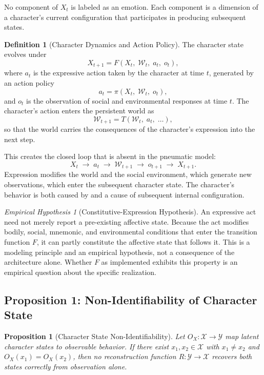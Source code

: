 \documentclass[11pt,a4paper]{article}
\theoremstyle{plain}
\newtheorem{proposition}[theorem]{Proposition}
\theoremstyle{definition}
\newtheorem{definition}[theorem]{Definition}
\theoremstyle{remark}
\newtheorem{hypothesis}[theorem]{Empirical Hypothesis}
\begin{document}
No component of $X_t$ is labeled as an emotion. Each component is a dimension of a character's current configuration that participates in producing subsequent states.

\begin{definition}[Character Dynamics and Action Policy]
The character state evolves under
\[
X_{t+1} = F(X_t,\; \mathcal{W}_t,\; a_t,\; o_t),
\]
where $a_t$ is the expressive action taken by the character at time $t$, generated by an action policy
\[
a_t = \pi(X_t,\; \mathcal{W}_t,\; o_t),
\]
and $o_t$ is the observation of social and environmental responses at time $t$. The character's action enters the persistent world as
\[
\mathcal{W}_{t+1} = T(\mathcal{W}_t,\; a_t,\; \ldots),
\]
so that the world carries the consequences of the character's expression into the next step.
\end{definition}

This creates the closed loop that is absent in the pneumatic model:
\[
X_t \;\to\; a_t \;\to\; \mathcal{W}_{t+1} \;\to\; o_{t+1} \;\to\; X_{t+1}.
\]
Expression modifies the world and the social environment, which generate new observations, which enter the subsequent character state. The character's behavior is both caused by and a cause of subsequent internal configuration.

\begin{hypothesis}[Constitutive-Expression Hypothesis]
An expressive act need not merely report a pre-existing affective state. Because the act modifies bodily, social, mnemonic, and environmental conditions that enter the transition function $F$, it can partly constitute the affective state that follows it. This is a modeling principle and an empirical hypothesis, not a consequence of the architecture alone. Whether $F$ as implemented exhibits this property is an empirical question about the specific realization.
\end{hypothesis}

\subsection{Proposition 1: Non-Identifiability of Character State}

\begin{proposition}[Character State Non-Identifiability]
\label{prop:nonid}
Let $O_X : \mathcal{X} \to \mathcal{Y}$ map latent character states to observable behavior. If there exist $x_1, x_2 \in \mathcal{X}$ with $x_1 \neq x_2$ and $O_X(x_1) = O_X(x_2)$, then no reconstruction function $R : \mathcal{Y} \to \mathcal{X}$ recovers both states correctly from observation alone.
\end{proposition}
\end{document}
